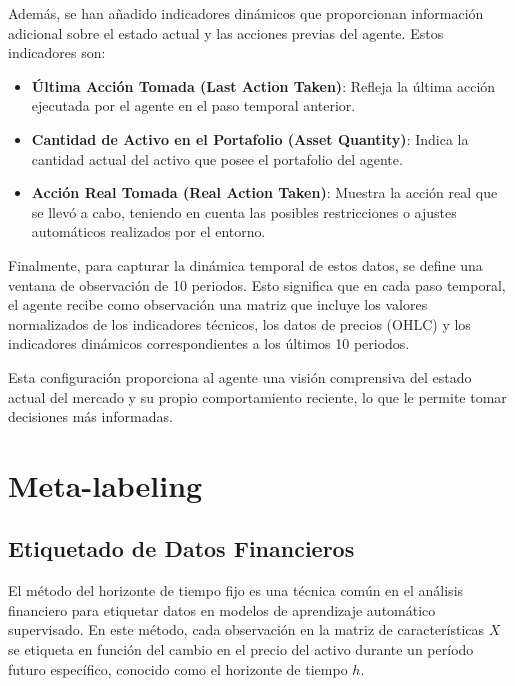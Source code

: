 \documentclass[a4paper,12pt]{report}
\begin{document}
Además, se han añadido indicadores dinámicos que proporcionan información adicional sobre 
el estado actual y las acciones previas del agente. Estos indicadores son:

\begin{itemize}
    \item \textbf{Última Acción Tomada (Last Action Taken)}: Refleja la última acción ejecutada 
    por el agente en el paso temporal anterior.
    
    \item \textbf{Cantidad de Activo en el Portafolio (Asset Quantity)}: Indica la cantidad actual 
    del activo que posee el portafolio del agente.

    \item \textbf{Acción Real Tomada (Real Action Taken)}: Muestra la acción real que se llevó a cabo, 
    teniendo en cuenta las posibles restricciones o ajustes automáticos realizados por el entorno.
\end{itemize}

Finalmente, para capturar la dinámica temporal de estos datos, se define una ventana de observación 
de 10 periodos. Esto significa que en cada paso temporal, el agente recibe como observación una 
matriz que incluye los valores normalizados de los indicadores técnicos, los datos de precios (OHLC) 
y los indicadores dinámicos correspondientes a los últimos 10 periodos. 

Esta configuración proporciona al agente una visión comprensiva del estado actual del mercado y 
su propio comportamiento reciente, lo que le permite tomar decisiones más informadas.




\chapter{Meta-labeling}

\section{Etiquetado de Datos Financieros}

El método del horizonte de tiempo fijo es una técnica común en el análisis financiero para etiquetar datos en modelos de aprendizaje automático supervisado. En este método, cada observación en la matriz de características \(X\) se etiqueta en función del cambio en el precio del activo durante un período futuro específico, conocido como el horizonte de tiempo \(h\).
\end{document}
